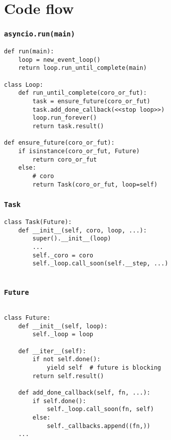 \documentclass[compress,usenames,dvipsnames]{beamer}
\begin{document}
\section{Code flow}

\begin{frame}
    \frametitle{\lstinline{asyncio.run(main)}}
    \begin{lstlisting}
def run(main):
    loop = new_event_loop()
    return loop.run_until_complete(main)

class Loop:
    def run_until_complete(coro_or_fut):
        task = ensure_future(coro_or_fut)
        task.add_done_callback(<<stop loop>>)
        loop.run_forever()
        return task.result()

def ensure_future(coro_or_fut):
    if isinstance(coro_or_fut, Future)
        return coro_or_fut
    else:
        # coro
        return Task(coro_or_fut, loop=self)

    \end{lstlisting}
\end{frame}

\begin{frame}
    \frametitle{\lstinline{Task}}
    \begin{lstlisting}
class Task(Future):
    def __init__(self, coro, loop, ...):
        super().__init__(loop)
        ...
        self._coro = coro
        self._loop.call_soon(self.__step, ...)
    
    \end{lstlisting}
\end{frame}

\begin{frame}
    \frametitle{\lstinline{Future}}
    \scriptsize
    \begin{lstlisting}

class Future:
    def __init__(self, loop):
        self._loop = loop

    def __iter__(self):
        if not self.done():
            yield self  # future is blocking
        return self.result()

    def add_done_callback(self, fn, ...):
        if self.done():
            self._loop.call_soon(fn, self)
        else:
            self._callbacks.append((fn,))
    ...

    \end{lstlisting}
\end{frame}
\end{document}

